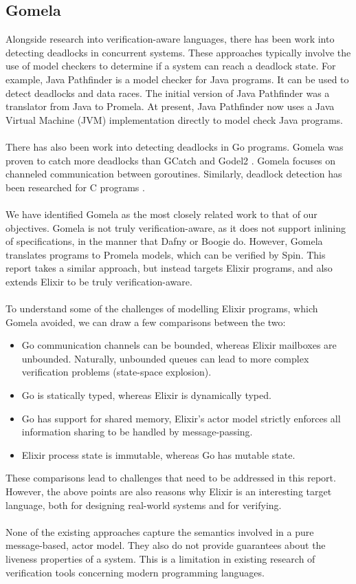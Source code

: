 \subsection{Gomela}
Alongside research into verification-aware languages, there has been work into detecting deadlocks in concurrent systems. These approaches typically involve the use of model checkers to determine if a system can reach a deadlock state. For example, Java Pathfinder \cite{jpf} is a model checker for Java programs. It can be used to detect deadlocks and data races. The initial version of Java Pathfinder was a translator from Java to Promela. At present, Java Pathfinder now uses a Java Virtual Machine (JVM) implementation directly to model check Java programs.
\\ \\
There has also been work into detecting deadlocks in Go programs. Gomela \cite{gomela} was proven to catch more deadlocks than GCatch \cite{gcatch} and Godel2 \cite{godel2}. Gomela focuses on channeled communication between goroutines. Similarly, deadlock detection has been researched for C programs \cite{c_to_promela}. 
\\ \\
We have identified Gomela as the most closely related work to that of our objectives. Gomela is not truly verification-aware, as it does not support inlining of specifications, in the manner that Dafny or Boogie do. However, Gomela translates programs to Promela models, which can be verified by Spin. This report takes a similar approach, but instead targets Elixir programs, and also extends Elixir to be truly verification-aware.  
\\ \\
To understand some of the challenges of modelling Elixir programs, which Gomela avoided, we can draw a few comparisons between the two:
\begin{itemize}
    \item Go communication channels can be bounded, whereas Elixir mailboxes are unbounded. Naturally, unbounded queues can lead to more complex verification problems (state-space explosion).
    \item Go is statically typed, whereas Elixir is dynamically typed.
    \item Go has support for shared memory, Elixir's actor model strictly enforces all information sharing to be handled by message-passing.
    \item Elixir process state is immutable, whereas Go has mutable state.
\end{itemize}
These comparisons lead to challenges that need to be addressed in this report. However, the above points are also reasons why Elixir is an interesting target language, both for designing real-world systems and for verifying.
\\ \\
None of the existing approaches capture the semantics involved in a pure message-based, actor model. They also do not provide guarantees about the liveness properties of a system. This is a limitation in existing research of verification tools concerning modern programming languages.
